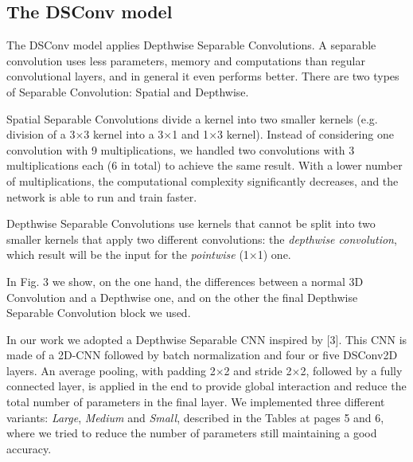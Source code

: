 \documentclass[conference]{IEEEtran}
\begin{document}
\subsection{The DSConv model}
The DSConv model applies Depthwise Separable Convolutions. A separable convolution uses less parameters,  memory and computations than regular convolutional layers, and in general it even performs better.
There are two types of Separable Convolution: Spatial and Depthwise.

Spatial Separable Convolutions divide a kernel into two smaller kernels (e.g. division of a 3$\times$3 kernel into a 3$\times$1 and 1$\times$3 kernel). Instead of considering one convolution with 9 multiplications, we handled two convolutions with 3 multiplications each (6 in total) to achieve the same result. With a lower number of multiplications, the computational complexity significantly decreases, and the network is able to run and train faster.

Depthwise Separable Convolutions use kernels that cannot be split into two smaller kernels that apply two different convolutions: the \textit{depthwise convolution}, which result will be the input for the \textit{pointwise} (1$\times$1) one.

In Fig. 3 we show, on the one hand, the differences between a normal 3D Convolution and a Depthwise one, and on the other the final Depthwise Separable Convolution block we used. 

In our work we adopted a Depthwise Separable CNN inspired by [3]. This CNN is made of a 2D-CNN followed by batch normalization and four or five DSConv2D layers. An average pooling, with padding 2$\times$2 and stride 2$\times$2, followed by a fully connected layer, is applied in the end to provide global interaction and reduce the total number of parameters in the final layer.
We implemented three different variants: \textit{Large}, \textit{Medium} and \textit{Small}, described in the Tables at pages 5 and 6, where we tried to reduce the number of parameters still maintaining a good accuracy.
\end{document}
